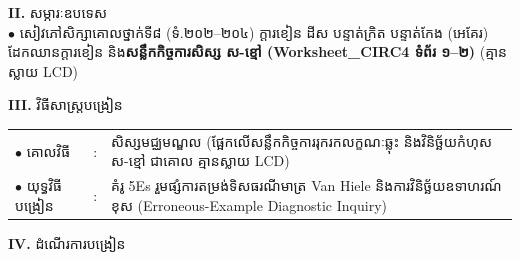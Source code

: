 \documentclass[a4paper,10pt]{article}
\newcommand{\en}[1]{{\TimesEn #1}}
\begin{document}
{%
\textbf{II.} {\muol សម្ភារៈឧបទេស}\\[1pt]
\hspace*{0.55cm}$\bullet$ \hspace{0.35cm} សៀវភៅសិក្សាគោលថ្នាក់ទី៨ (ទំ.២០២--២០៤) ក្ដារខៀន ដីស បន្ទាត់ក្រិត បន្ទាត់កែង (អេគែរ) ដែកឈានក្ដារខៀន និង\textbf{សន្លឹកកិច្ចការសិស្ស ស-ខ្មៅ (\en{Worksheet\_CIRC4} ទំព័រ ១--២)} (គ្មានស្លាយ \en{LCD})

\vspace{1pt}

\textbf{III.} {\muol វិធីសាស្រ្តបង្រៀន}\\[1pt]
\hspace*{0.45cm}%
\begin{tabular}{@{}l l L{14.85cm}@{}}
  $\bullet$ \hspace{0.25cm} គោលវិធី & : & សិស្សមជ្ឈមណ្ឌល (ផ្អែកលើសន្លឹកកិច្ចការរុករកលក្ខណៈឆ្លុះ និងវិនិច្ឆ័យកំហុស ស-ខ្មៅ ជាគោល គ្មានស្លាយ \en{LCD}) \\
  $\bullet$ \hspace{0.25cm} យុទ្ធវិធីបង្រៀន & : & គំរូ 5Es រួមផ្សំការតម្រង់ទិសធរណីមាត្រ \en{Van Hiele} និងការវិនិច្ឆ័យឧទាហរណ៍ខុស (\en{Erroneous-Example Diagnostic Inquiry}) \\
\end{tabular}
}

\vspace{1pt}

\textbf{IV.} {\muol ដំណើរការបង្រៀន}

\vspace{1pt}
\end{document}
